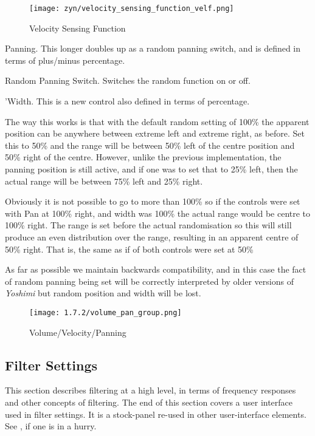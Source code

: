 \begin{figure}[H]
   \centering
   \texttt{[image: zyn/velocity\_sensing\_function\_velf.png]}
   \caption{Velocity Sensing Function}
   \label{fig:velocity_sensing_function}
\end{figure}

   Panning.
   This longer doubles up as a random panning switch, and is defined in terms
   of plus/minus percentage.

   Random Panning Switch.
   Switches the random function on or off.

   'Width.
   This is a new control also defined in terms of percentage.

   The way this works is that with the default random setting of 100\% the
   apparent position can be anywhere between extreme left and extreme right,
   as before. Set this to 50\% and the range will be between 50\% left of the
   centre position and 50\% right of the centre. However, unlike the previous
   implementation, the panning position is still active, and if one was to set
   that to 25\% left, then the actual range will be between 75\% left and 25\%
   right.

   Obviously it is not possible to go to more than 100\% so if the controls
   were set with Pan at 100\% right, and width was 100\% the actual range
   would be centre to 100\% right. The range is set before the actual
   randomisation so this will still produce an even distribution over the
   range, resulting in an apparent centre of 50\% right. That is, the same as
   if of both controls were set at 50\%

   As far as possible we maintain backwards compatibility, and in this case
   the fact of random panning being set will be correctly interpreted by older
   versions of \textsl{Yoshimi} but random position and width will be lost.

\begin{figure}[H]
   \centering
   \texttt{[image: 1.7.2/volume\_pan\_group.png]}
   \caption{Volume/Velocity/Panning}
   \label{fig:volume_pan_group}
\end{figure}

\subsection{Filter Settings}
\label{subsec:filter_settings}

   This section describes filtering at a high level, in terms of frequency
   responses and other concepts of filtering.
   The end of this section covers a user interface used in filter settings.
   It is a stock-panel re-used in other user-interface elements.
   See ,
   if one is in a hurry.

